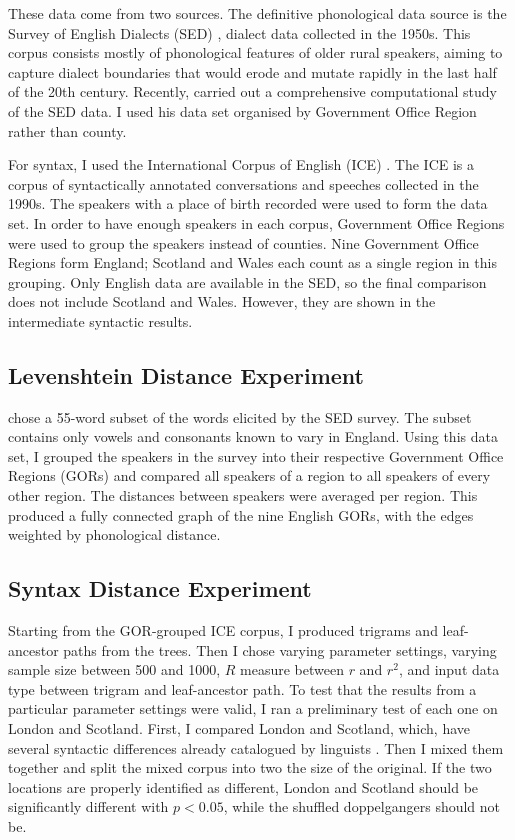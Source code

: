\documentclass[11pt]{article}
\begin{document}
These data come from two sources. The definitive phonological data
source is the Survey of English Dialects (SED) \cite{orton63}, dialect
data collected in the 1950s. This corpus consists mostly of
phonological features of older rural speakers, aiming to capture
dialect boundaries that would erode and mutate rapidly in the last
half of the 20th century. Recently,  carried
out a comprehensive computational study of the SED data. I used his
data set organised by Government Office Region rather than county.

For syntax, I used the International Corpus of English (ICE)
\cite{nelson02}. The ICE is a corpus of syntactically annotated
conversations and speeches collected in the 1990s. The speakers with a
place of birth recorded were used to form the data set. In order to
have enough speakers in each corpus, Government Office Regions were
used to group the speakers instead of counties. Nine Government Office
Regions form England; Scotland and Wales each count as a single region
in this grouping. Only English data are available in the SED, so the
final comparison does not include Scotland and Wales. However, they
are shown in the intermediate syntactic results.

\subsection{Levenshtein Distance Experiment}

 chose a 55-word subset of the words elicited
by the SED survey. The subset contains only vowels and consonants
known to vary in England. Using this data set, I grouped the speakers
in the survey into their respective Government Office Regions (GORs)
and compared all speakers of a region to all speakers of every other
region. The distances between speakers were averaged per region.
This produced a fully connected graph of the nine
English GORs, with the edges weighted by phonological
distance.

\subsection{Syntax Distance Experiment}

Starting from the GOR-grouped ICE corpus, I produced trigrams and
leaf-ancestor paths from the trees. Then I chose varying parameter
settings, varying sample size between 500 and 1000, $R$ measure
between $r$ and $r^2$, and input data type between trigram and
leaf-ancestor path. To test that the results from a particular
parameter settings were valid, I ran a preliminary test of each one on
London and Scotland. First, I compared London and Scotland, which,
have several syntactic differences already catalogued by linguists
\cite{aitken79}.  Then I mixed them together and split the mixed
corpus into two the size of the original. If the two locations are
properly identified as different, London and Scotland should be
significantly different with $p < 0.05$, while the shuffled
doppelgangers should not be.
\end{document}

